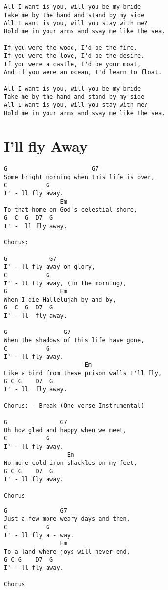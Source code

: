 \documentclass[leqno]{memoir}
\begin{document}
\newpage
\begin{verbatim}
All I want is you, will you be my bride
Take me by the hand and stand by my side
All I want is you, will you stay with me?
Hold me in your arms and sway me like the sea.

If you were the wood, I'd be the fire.
If you were the love, I'd be the desire.
If you were a castle, I'd be your moat,
And if you were an ocean, I'd learn to float.

All I want is you, will you be my bride
Take me by the hand and stand by my side
All I want is you, will you stay with me?
Hold me in your arms and sway me like the sea.

\end{verbatim}
\newpage

\chapter{I'll fly Away}

\begin{verbatim}
G                        G7       
Some bright morning when this life is over,
C           G                  
I' - ll fly away. 
                Em
To that home on God's celestial shore,
G  C  G  D7  G
I' -  ll fly away.

Chorus:

G            G7
I' - ll fly away oh glory,
C           G
I' - ll fly away, (in the morning),
G               Em
When I die Hallelujah by and by,
G  C  G  D7  G
I' - ll  fly away.

G                G7       
When the shadows of this life have gone,
C           G                  
I' - ll fly away.
                       Em
Like a bird from these prison walls I'll fly,
G C G    D7  G
I' - ll  fly away.

Chorus: - Break (One verse Instrumental)

G               G7       
Oh how glad and happy when we meet,
C           G                  
I' - ll fly away.
                  Em
No more cold iron shackles on my feet,
G C G    D7  G
I' - ll fly away.

Chorus
\end{verbatim}
\newpage
\begin{verbatim}
G               G7       
Just a few more weary days and then,
C           G                  
I' - ll fly a - way.
                Em
To a land where joys will never end,
G C G    D7  G
I' - ll fly away.

Chorus
\end{verbatim}
\newpage
\end{document}
